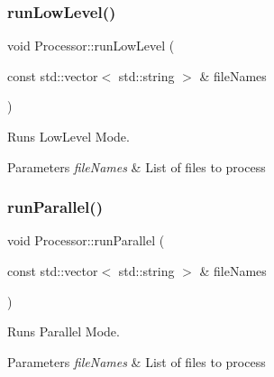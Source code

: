 \mbox{\label{class_processor_ae697c1dd3136d1cf973d0ecc5a65a53a}} 
\subsubsection{\texorpdfstring{run\+Low\+Level()}{runLowLevel()}}
{\footnotesize\ttfamily void Processor\+::run\+Low\+Level (\begin{DoxyParamCaption}\item[{const std\+::vector$<$ std\+::string $>$ \&}]{file\+Names }\end{DoxyParamCaption})\hspace{0.3cm}{\ttfamily [private]}}



Runs Low\+Level Mode. 


\begin{DoxyParams}{Parameters}
{\em file\+Names} & List of files to process \\
\hline
\end{DoxyParams}
\mbox{\label{class_processor_a1e5a47f8539e3568e2ba8f14f1fddea2}} 
\subsubsection{\texorpdfstring{run\+Parallel()}{runParallel()}}
{\footnotesize\ttfamily void Processor\+::run\+Parallel (\begin{DoxyParamCaption}\item[{const std\+::vector$<$ std\+::string $>$ \&}]{file\+Names }\end{DoxyParamCaption})\hspace{0.3cm}{\ttfamily [private]}}



Runs Parallel Mode. 


\begin{DoxyParams}{Parameters}
{\em file\+Names} & List of files to process \\
\hline
\end{DoxyParams}
\mbox{\label{class_processor_ae045ebe853cd1f2124ecb93b829a9113}} 
